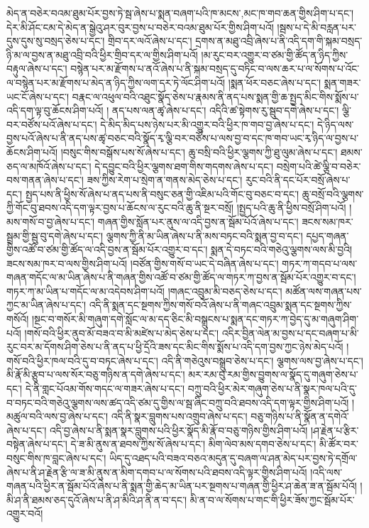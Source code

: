 མེད་ན་བཅེར་བའམ་ཐུམ་པོར་བྱས་ཏེ་སྦ་ཞེས་པ་སྨན་བཞག་པའི་ཁ་{མངས་,མང་}ཁ་གབ་ཆན་གྱིས་ཤིག་པ་དང་། དེར་མི་ཤོང་ངམ་དེ་མེད་ན་སྒྱེའུ་ཤར་བུར་བྱས་པ་བཅེར་བའམ་ཐུམ་པོར་གྱིས་ཤིག་པའོ། །སྦས་པ་དེ་མི་བརླན་པར་དུས་དུས་སུ་བསྲད་ཅེས་པ་དང་། གྲིབ་དར་ལའོ་ཞེས་པ་དང་། དྲགས་ན་མཐུ་འབྲི་ཞེས་པ་ནི་འདི་དག་གི་སྐམ་བསྲད་ཉི་མ་ལ་བྱས་ན་མཐུ་འབྲི་བའི་ཕྱིར་གྲིབ་དར་ལ་གྱིས་ཤིག་པའོ། །མ་རུང་བར་འགྱུར་བ་ཙམ་གྱི་ཚོད་ན་ཉིད་ཀྱིས་བརྟུལ་ཞེས་པ་དང་། བསྙེན་པར་མ་རྫོགས་པ་ནའོ་ཞེས་པ་ནི་སྐམ་བསྲད་དུ་བཏིང་བ་ལས་ཆར་པ་ལ་སོགས་པ་འོང་ལ་བསྙེན་པར་མ་རྫོགས་པ་མེད་ན་ཉིད་ཀྱིས་ལག་དར་ཏེ་ལོང་ཤིག་པའོ། །སྨན་ཕོར་བཅང་ཞེས་པ་དང་། སྨན་གཟར་ཡང་ངོ་ཞེས་པ་དང་། བརྣང་ལ་འཕུལ་བའི་འཐུང་སྣོད་ཅེས་པ་རྣམས་ནི་ནད་པས་སྨན་གྱི་ཆ་སྤྱད་མིང་གིས་སྨོས་པ་འདི་དག་ལྟ་བུ་ཆོངས་ཤིག་པའོ། །
ནད་པས་ལན་ཚྭ་ཞེས་པ་དང་། འདིའི་ཚ་སྟེགས་རུ་སྦུབ་དགེ་ཞེས་པ་དང་། ལྕི་བར་བཙོས་པའོ་ཞེས་པ་དང་། དེ་མིད་མིད་པས་ཉེས་པར་མི་འགྱུར་བའི་ཕྱིར་ཁ་གབ་བྱ་ཞེས་པ་དང་། དེ་ཉིད་ལས་བྱས་པའོ་ཞེས་པ་ནི་ནད་པས་ཚྭ་བཅང་བའི་སྣོད་རྭ་ལྕི་བར་བཙོས་པ་ལས་བྱ་བ་དང་ཁ་གབ་ཡང་རྭ་ཉིད་ལ་བྱས་པ་ཆོངས་ཤིག་པའོ། །བསུང་གིས་བསྒོས་པས་སོ་ཞེས་པ་དང་། ཆུ་བསྲི་བའི་ཕྱིར་ལྕགས་ཀྱི་ཐུ་ལུམ་ཞེས་པ་དང་། ཐམས་ཅད་ལ་མཁོའོ་ཞེས་པ་དང་། དེ་དབྱུང་བའི་ཕྱིར་ལྕགས་ཐག་གིས་གདགས་ཞེས་པ་དང་། བསྲེག་པའི་ཚེ་ལྕི་བ་བཅེར་བས་གནན་ཞེས་པ་དང་། ཟས་ཀྱིས་རེག་པ་སྲེག་ན་གནས་མེད་ཅེས་པ་དང་། རུང་བའི་ནི་དང་པོར་བསྲོ་ཞེས་པ་དང་། སྤྱད་པས་ནི་ཕྱིས་སོ་ཞེས་པ་ནད་པས་ནི་བསུང་ཅན་གྱི་འཇིམ་པའི་གོང་བུ་བཅང་བ་དང་། ཆུ་བསྲོ་བའི་ལྕགས་ཀྱི་གོང་བུ་ཐབས་འདི་དག་ལྟར་བྱས་པ་ཆོངས་ལ་རུང་བའི་ཆུ་ནི་སྔར་བསྲོ། །སྤྱད་པའི་ཆུ་ནི་ཕྱིས་བསྲོ་ཤིག་པའོ། །མས་གསོ་བ་བྱ་ཞེས་པ་དང་། གཞན་གྱིས་སློན་པར་ནུས་ལ་འདི་བྱས་ན་སྦོམ་པོའོ་ཞེས་པ་དང་། ཟངས་སམ་ཁར་སྦྲམ་གྱི་སྦུ་བུ་དགེ་ཞེས་པ་དང་། ལྕགས་ཀྱི་ནི་མ་ཡིན་ཞེས་པ་ནི་མས་བཏང་བའི་སྨན་བྱ་བ་དང་། དཔྱད་གཞན་གྱིས་འཚོ་བ་ཙམ་གྱི་ཚོད་ལ་འདི་བྱས་ན་སྦོམ་པོར་འགྱུར་བ་དང་། སྨན་དེ་བཏང་བའི་གཅེའུ་ལྕགས་ལས་མི་བྱའི། ཟངས་སམ་ཁར་བ་ལས་གྱིས་ཤིག་པའོ། །བཙོན་གྱིས་གསོ་བ་ཡང་དེ་བཞིན་ཞེས་པ་དང་། གཏར་ཀ་གདབ་པ་ལས་གཞན་གདོང་ལ་མ་ཡིན་ཞེས་པ་ནི་གཞན་གྱིས་འཚོ་བ་ཙམ་གྱི་ཚོད་ལ་གཏར་ཀ་བྱས་ན་སྦོམ་པོར་འགྱུར་བ་དང་། གཏར་ཀ་མ་ཡིན་པ་གདོང་ལ་མ་འདེབས་ཤིག་པའོ། །གཞང་འབྲུམ་མི་བཅད་ཅེས་པ་དང་། མཚོན་ལས་གཞན་པས་ཀྱང་མ་ཡིན་ཞེས་པ་དང་། འདི་ནི་སྨན་དང་སྔགས་ཀྱིས་གསོ་བའོ་ཞེས་པ་ནི་གཞང་འབྲུམ་སྨན་དང་སྔགས་ཀྱིས་གསོའོ། །སྔང་བ་གསོར་མི་གཞུག་དགེ་སློང་ལ་མ་དད་ཅིང་མི་བསྒྲུངས་པ་སྨན་དང་གཏར་ཀ་བྱེད་དུ་མ་གཞུག་ཤིག་པའོ། །གསོ་བའི་ཕྱིར་ནུབ་མོ་བཟའ་བ་མི་མཛེས་པ་མེད་ཅེས་པ་དང་། འདིར་བྱིན་ལེན་མ་བྱས་པ་དང་བཞག་པ་མི་རུང་བར་མ་དོགས་ཤིག་ཅེས་པ་ནི་ནད་པ་ཕྱི་དྲོའི་ཟས་དང་མིང་གིས་སྨོས་པ་འདི་དག་བྱས་ཀྱང་ཉེས་མེད་པའོ། །གསོ་བའི་ཕྱིར་ཁལ་བའི་དུ་བ་བཏང་ཞེས་པ་དང་། འདི་ནི་གཅེའུས་བསྒྲུབ་ཅེས་པ་དང་། ལྕགས་ལས་བྱ་ཞེས་པ་དང་། མི་རྣོ་མི་རྩུབ་པ་ལས་སོར་བཅུ་གཉིས་ན་དགེ་ཞེས་པ་དང་། མར་རམ་བུ་རམ་གྱིས་བྱུགས་ལ་སྣོད་དུ་གཞུག་ཅེས་པ་དང་། དེ་ནི་གླང་པོའམ་གོས་གདང་ལ་གཟར་ཞེས་པ་དང་། བཀྲུ་བའི་ཕྱིར་མེར་གཞུག་ཅེས་པ་ནི་སྣར་ཁལ་པའི་དུ་བ་བཏང་བའི་གཅེའུ་ལྕགས་ལས་ཚད་འདི་ཙམ་དུ་གྱིས་ལ་སྦ་ཞིང་བཀྲུ་བའི་ཐབས་འདི་དག་ལྟར་གྱིས་ཤིག་པའོ། །མཚུལ་བའི་ལས་བྱ་ཞེས་པ་དང་། འདི་ནི་སྣར་བླུགས་པས་འགྲུབ་ཞེས་པ་དང་། བཅུ་གཉིས་པ་ནི་སྣོན་ན་དགེའོ་ཞེས་པ་དང་། འདི་བྱ་ཞེས་པ་ནི་སྨན་སྣར་བླུགས་པའི་ཕྱིར་སྣོད་མི་རྣོ་བ་བཅུ་གཉིས་གྱིས་ཤིག་པའོ། །ཤ་རྗེན་པ་རྩིར་བསྟེན་ཞེས་པ་དང་། དེ་ཟ་མི་ནུས་ན་ཐབས་ཀྱིས་སོ་ཞེས་པ་དང་། མིག་ལེབ་མས་དགབ་ཅེས་པ་དང་། མི་ཚོར་བར་བསུང་གིས་ཁ་བླང་ཞེས་པ་དང་། ཡིད་དུ་འཐད་པའི་བཟའ་བཅའ་མདུན་དུ་བཞག་ལ་ཤན་མེད་པར་བྱས་ཏེ་དགྲོལ་ཞེས་པ་ནི་ཤ་རྗེན་རྩི་ལ་ཟ་མི་ནུས་ན་མིག་དགབ་པ་ལ་སོགས་པའི་ཐབས་འདི་ལྟར་གྱིས་ཤིག་པའོ། །འདི་ལས་གཞན་པའི་ཕྱིར་ན་སྦོམ་པོའོ་ཞེས་པ་ནི་སྨན་གྱི་ཆེད་མ་ཡིན་པར་སྔགས་པ་གཞན་གྱི་ཕྱིར་ཤ་ཆེན་ཟ་ན་སྦོམ་པོའོ། །མི་ཤ་ནི་ཐམས་ཅད་དུའོ་ཞེས་པ་ནི་ཤ་མིའི་ཤ་ནི་ན་བ་དང་། མི་ན་བ་ལ་སོགས་པ་གང་གི་ཕྱིར་ཟོས་ཀྱང་སྦོམ་པོར་འགྱུར་བའོ། 